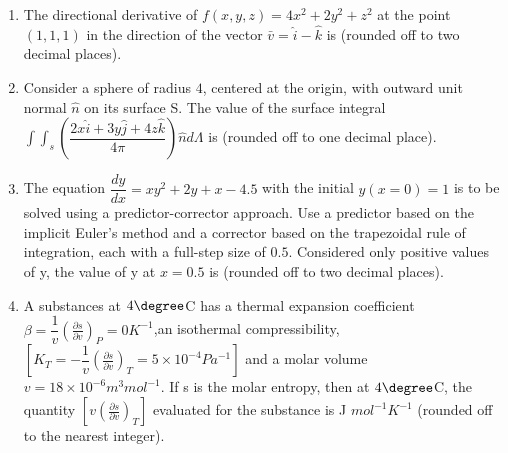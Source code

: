 \documentclass[journal]{IEEEtran}
\numberwithin{equation}{enumi}
\numberwithin{figure}{enumi}
\begin{document}
\begin{enumerate}[start=1, label={Q\arabic*.}]
\begin{table}[h]
\begin{tabular}{|c|l|c|l|}
\end{tabular}
\end{table}
\begin{enumerate} 
  \end{enumerate}
\item The directional derivative of $f(x,y,z)=4x^2+2y^2+z^2$ at the point $(1,1,1)$ in the direction of the vector $\bar{v}=\hat{i}-\hat{k}$ is \underline{\hspace{1.5cm}} (rounded off to two decimal places).
\vspace{0.2cm}
\item Consider a sphere of radius $4$, centered at the origin, with outward unit normal $\hat{n}$ on its surface S. The value of the surface integral $\int \int _s(\dfrac{2x\hat{i} +3y\hat{j} +4z\hat{k}}{4\pi})\hat{n} d\Lambda$ is \underline{\hspace{1.5cm}} (rounded off to one decimal place).
\vspace{0.2cm}
\item The equation $\dfrac{dy}{dx}=xy^2+2y+x-4.5$ with the initial $y(x=0)=1$ is to be solved using a predictor-corrector approach. Use a predictor based on the implicit Euler's method and a corrector based on the trapezoidal rule of integration, each with a full-step size of $0.5$. Considered only positive values of y, the value of y at $x=0.5$ is \underline{\hspace{1.5cm}} (rounded off to two decimal places).
\newpage
\item A substances at $4\degree$C has a thermal expansion coefficient $ \beta = \dfrac{1}{v} \left(\frac{\partial s}{\partial v}\right)_P= 0 K^{-1} $,an isothermal compressibility, $ \left[ K_T =-\dfrac{1}{v} \left(\frac{\partial s}{\partial v}\right)_T = 5 \times10^{-4}Pa^{-1} \right] $ and a molar volume $v=18 \times 10^{-6} m^3 mol^{-1}$. If 
s is the molar entropy, then at $4\degree$C, the quantity 
$ \left[ v \left(\frac{\partial s}{\partial v}\right)_T \right] $ evaluated for the substance is \underline{\hspace{1.5cm}}J $mol^{-1} K^{-1}$ (rounded off to the nearest integer).


\end{enumerate}
\end{document}
